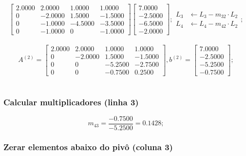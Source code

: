 \documentclass[12pt]{article}
\begin{document}
                \[
                \begin{bmatrix}
                    2.0000 & 2.0000 & 1.0000 & 1.0000 \\
                    0 & -2.0000 & 1.5000 & -1.5000 \\
                    0 & -1.0000 & -4.5000 & -3.5000 \\
                    0 & -1.0000 & 0 & -1.0000
                \end{bmatrix}
                \begin{bmatrix}
                        7.0000 \\ -2.5000 \\ -6.5000 \\ -2.0000
                \end{bmatrix};
                \begin{aligned}
                    L_3 &\leftarrow L_3 - m_{32} \cdot L_2 \\
                    L_4 &\leftarrow L_4 - m_{42} \cdot L_2
                \end{aligned};
                \]\\

                \[
                A^{(2)} = \begin{bmatrix}
                    2.0000 & 2.0000 & 1.0000 & 1.0000 \\
                    0 & -2.0000 & 1.5000 & -1.5000 \\
                    0 & 0 & -5.2500 & -2.7500 \\
                    0 & 0 & -0.7500 & 0.2500
                \end{bmatrix},
                b^{(2)} = \begin{bmatrix}
                        7.0000 \\ -2.5000 \\ -5.2500 \\ -0.7500
                \end{bmatrix};
                \]\\

                \subsubsection{Calcular multiplicadores (linha 3)}

                \[
                m_{43} = \frac{-0.7500}{-5.2500} = 0.1428;
                \]

            \subsubsection{Zerar elementos abaixo do pivô (coluna 3)}
\end{document}
